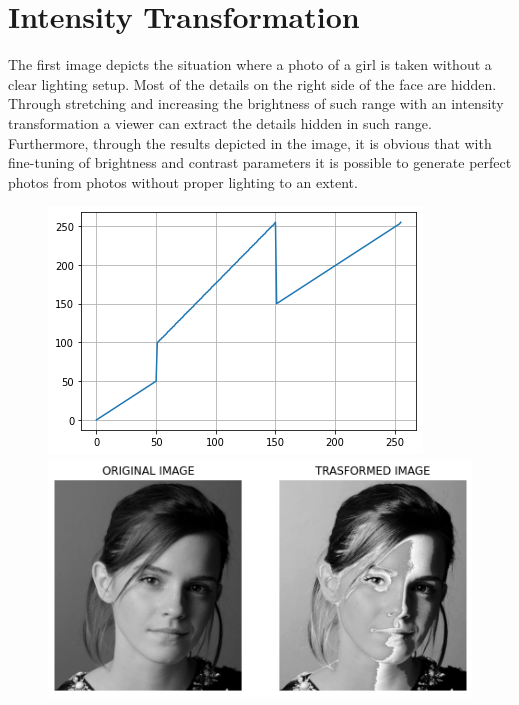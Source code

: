 \documentclass[12pt,a4paper]{article}
\begin{document}
\section{Intensity Transformation}
The first image depicts the situation where a photo of a girl is taken without a clear lighting setup. Most of the details on the right side of the face are hidden. Through stretching and increasing the brightness of such range with an intensity transformation a viewer can extract the details hidden in such range. Furthermore, through the results depicted in the image, it is obvious that with fine-tuning of brightness and contrast parameters it is possible to generate perfect photos from photos without proper lighting to an extent.
\begin{figure}[h]
    \begin{minipage}{.3\textwidth}
        \centering
        \includegraphics[width=.85\textwidth]{q1_1.png}
    \end{minipage}
    \begin{minipage}{.7\textwidth}
        \centering
        \includegraphics[width=.68\textwidth]{q1.png}
    \end{minipage}
\end{figure}
\end{document}

